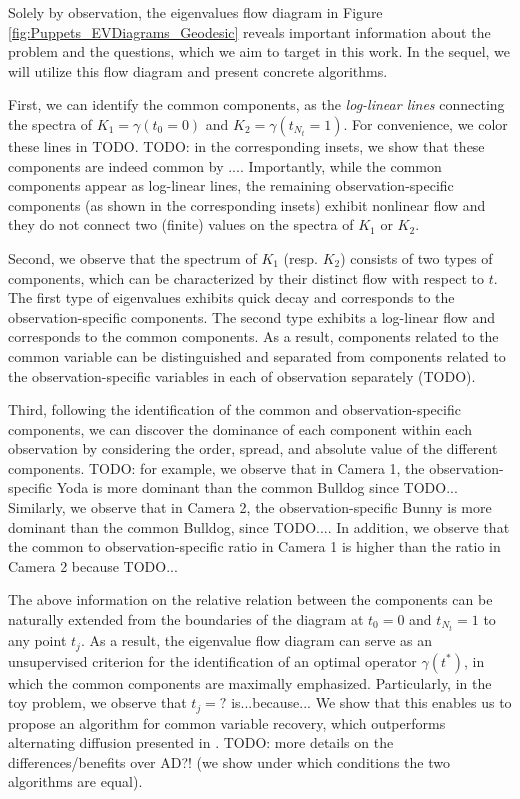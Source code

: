\documentclass[]{article}
\theoremstyle{definition}
\begin{document}

Solely by observation, the eigenvalues flow diagram in Figure \ref{fig:Puppets_EVDiagrams_Geodesic} reveals important information about the problem and the questions, which we aim to target in this work. In the sequel, we will utilize this flow diagram and present concrete algorithms.

First, we can identify the common components, as the \emph{log-linear lines} connecting the spectra of $K_1=\gamma(t_0=0)$ and $K_2=\gamma(t_{N_t}=1)$. For convenience, we color these lines in TODO. TODO: in the corresponding insets, we show that these components are indeed common by .... Importantly, while the common components appear as log-linear lines, the remaining observation-specific components (as shown in the corresponding insets) exhibit nonlinear flow and they do not connect two (finite) values on the spectra of $K_1$ or $K_2$. 

Second, we observe that the spectrum of $K_1$ (resp. $K_2$) consists of two types of components, which can be characterized by their distinct flow with respect to $t$. The first type of eigenvalues exhibits quick decay and corresponds to the observation-specific components. The second type exhibits a log-linear flow and corresponds to the common components. As a result, components related to the common variable can be distinguished and separated from components related to the observation-specific variables in each of observation separately (TODO). 

Third, following the identification of the common and observation-specific components, we can discover the dominance of each component within each observation by considering the order, spread, and absolute value of the different components.
TODO: for example, we observe that in Camera 1, the observation-specific Yoda is more dominant than the common Bulldog since TODO... Similarly, we observe that in Camera 2, the observation-specific Bunny is more dominant than the common Bulldog, since TODO.... In addition, we observe that the common to observation-specific ratio in Camera 1 is higher than the ratio in Camera 2 because TODO...

The above information on the relative relation between the components can be naturally extended from the boundaries of the diagram at $t_0=0$ and $t_{N_t}=1$ to any point $t_j$. As a result, the eigenvalue flow diagram can serve as an unsupervised criterion for the identification of an optimal operator $\gamma(t^*)$, in which the common components are maximally emphasized.
Particularly, in the toy problem, we observe that $t_j=?$ is...because...
We show that this enables us to propose an algorithm for common variable recovery, which outperforms alternating diffusion presented in \cite{TODO}. TODO: more details on the differences/benefits over AD?! (we show under which conditions the two algorithms are equal).
\end{document}
